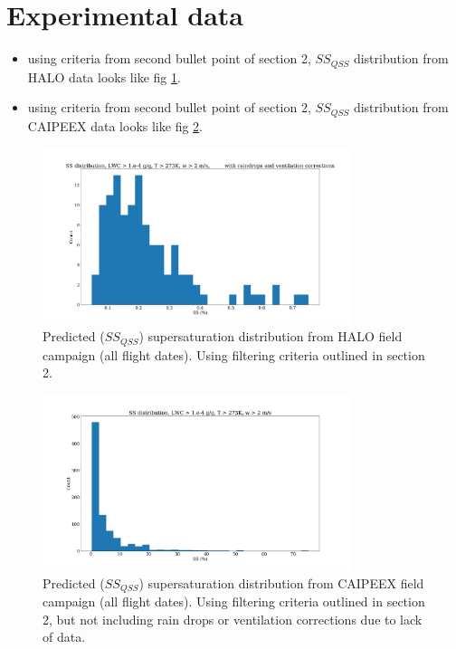 \documentclass{article}
\begin{document}
\section{Experimental data}
\begin{itemize}
	\item using criteria from second bullet point of section 2, $SS_{QSS}$ distribution from HALO data looks like fig \ref{haloqsshist}. 
	\item using criteria from second bullet point of section 2, $SS_{QSS}$ distribution from CAIPEEX data looks like fig \ref{caipeexqsshist}. 
\end{itemize}
\begin{figure}[ht]
    \centering
    \includegraphics[width=9cm]{halo/v3_ss_with_cip_from_cas_alldates_figure.png}
    \caption{Predicted ($SS_{QSS}$) supersaturation distribution from HALO field campaign (all flight dates). Using filtering criteria outlined in section 2.}
    \label{haloqsshist}
\end{figure}
\begin{figure}[ht]
    \centering
    \includegraphics[width=9cm]{caipeex/v1_ss_from_dsd_alldates_figure.png}
    \caption{Predicted ($SS_{QSS}$) supersaturation distribution from CAIPEEX field campaign (all flight dates). Using filtering criteria outlined in section 2, but not including rain drops or ventilation corrections due to lack of data.}
    \label{caipeexqsshist}
\end{figure}
\end{document}
